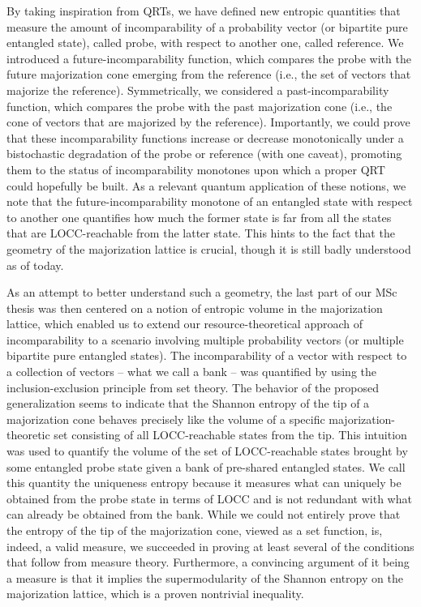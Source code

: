 By taking inspiration from QRTs, we have defined new entropic quantities that measure the amount of incomparability of a probability vector (or bipartite pure entangled state), called probe, with respect to another one, called reference. We introduced a future-incomparability function, which compares the probe with the future majorization cone emerging from the reference (i.e., the set of vectors that majorize the reference). Symmetrically, we considered a past-incomparability function, which compares the probe with the past majorization cone (i.e., the cone of vectors that are majorized by the reference). Importantly, we could prove that these incomparability functions increase or decrease monotonically under a bistochastic degradation of the probe or reference (with one caveat), promoting them to the status of incomparability monotones upon which a proper QRT could hopefully be built. As a relevant quantum application of these notions, we note that the future-incomparability monotone of an entangled state with respect to another one quantifies how much the former state is far from all the states that are LOCC-reachable from the latter state. This hints to the fact that the geometry of the majorization lattice is crucial, though it is still badly understood as of today. 

As an attempt to better understand such a geometry, the last part of our MSc thesis was then centered on a notion of entropic volume in the majorization lattice, which enabled us to extend our resource-theoretical approach of incomparability to a scenario involving multiple probability vectors (or multiple bipartite pure entangled states). The incomparability of a vector with respect to a collection of vectors – what we call a bank – was quantified by using the inclusion-exclusion principle from set theory. The behavior of the proposed generalization seems to indicate that the Shannon entropy of the tip of a majorization cone behaves precisely like the volume of a specific majorization-theoretic set consisting of all LOCC-reachable states from the tip. This intuition was used to quantify the volume of the set of LOCC-reachable states brought by some entangled probe state given a bank of pre-shared entangled states. We call this quantity the uniqueness entropy because it measures what can uniquely be obtained from the probe state in terms of LOCC and is not redundant with what can already be obtained from the bank. While we could not entirely prove that the entropy of the tip of the majorization cone, viewed as a set function, is, indeed, a valid measure, we succeeded in proving at least several of the conditions that follow from measure theory. Furthermore, a convincing argument of it being a measure is that it implies the supermodularity of the Shannon entropy on the majorization lattice, which is a proven nontrivial inequality.

